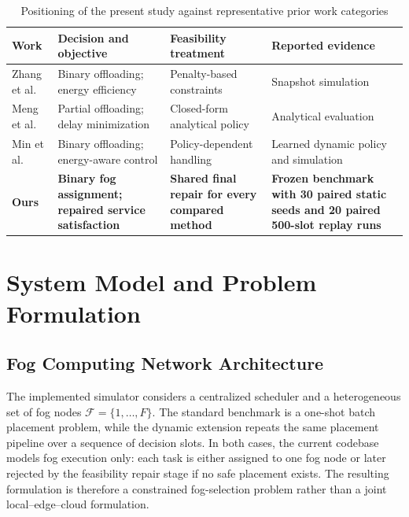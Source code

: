 \documentclass[pdflatex,sn-mathphys-num]{sn-jnl}
\begin{document}
\begin{table}[t]
\caption{Positioning of the present study against representative prior work categories}
\label{tab:related_work}
\centering
\small
\setlength{\tabcolsep}{3pt}
\begin{tabular}{p{}p{}p{}p{}}
\toprule
\textbf{Work} & \textbf{Decision and objective} & \textbf{Feasibility treatment} & \textbf{Reported evidence} \\
\midrule
Zhang et al. \cite{Zhang2016} & Binary offloading; energy efficiency & Penalty-based constraints & Snapshot simulation \\
Meng et al. \cite{Meng2019} & Partial offloading; delay minimization & Closed-form analytical policy & Analytical evaluation \\
Min et al. \cite{Min2019} & Binary offloading; energy-aware control & Policy-dependent handling & Learned dynamic policy and simulation \\
\textbf{Ours} & \textbf{Binary fog assignment; repaired service satisfaction} & \textbf{Shared final repair for every compared method} & \textbf{Frozen benchmark with 30 paired static seeds and 20 paired 500-slot replay runs} \\
\bottomrule
\end{tabular}
\end{table}



\section{System Model and Problem Formulation}

\subsection{Fog Computing Network Architecture}
The implemented simulator considers a centralized scheduler and a heterogeneous set of fog nodes $\mathcal{F}=\{1,\dots,F\}$. The standard benchmark is a one-shot batch placement problem, while the dynamic extension repeats the same placement pipeline over a sequence of decision slots. In both cases, the current codebase models fog execution only: each task is either assigned to one fog node or later rejected by the feasibility repair stage if no safe placement exists. The resulting formulation is therefore a constrained fog-selection problem rather than a joint local--edge--cloud formulation.
\end{document}
